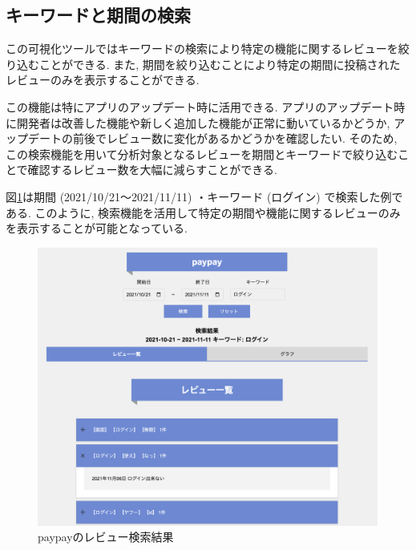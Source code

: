 \subsection{キーワードと期間の検索}
この可視化ツールではキーワードの検索により特定の機能に関するレビューを絞り込むことができる. また, 期間を絞り込むことにより特定の期間に投稿されたレビューのみを表示することができる.  

この機能は特にアプリのアップデート時に活用できる. アプリのアップデート時に開発者は改善した機能や新しく追加した機能が正常に動いているかどうか, アップデートの前後でレビュー数に変化があるかどうかを確認したい. そのため, この検索機能を用いて分析対象となるレビューを期間とキーワードで絞り込むことで確認するレビュー数を大幅に減らすことができる. 

図\ref{fig:paypay_search}は期間 (2021/10/21〜2021/11/11) ・キーワード (ログイン) で検索した例である. このように, 検索機能を活用して特定の期間や機能に関するレビューのみを表示することが可能となっている. 
\begin{figure}[H]
  \centering
  \includegraphics[scale=0.3]
    {contents/images/paypay_search.png}
  \caption{paypayのレビュー検索結果\label{fig:paypay_search}}
\end{figure}


